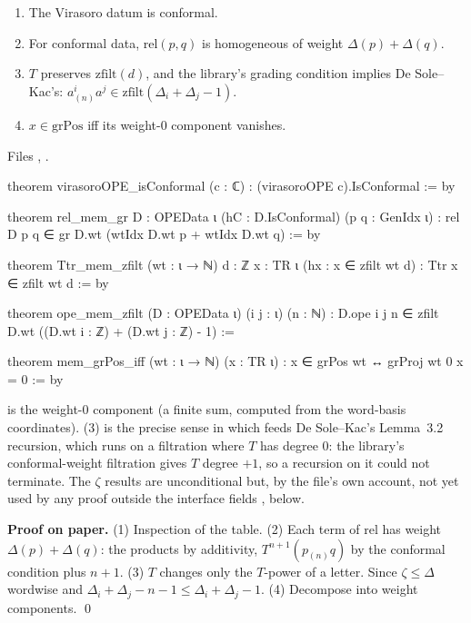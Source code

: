 \begin{theorem}\label{l11:thm:gradings}
\begin{enumerate}
\item The Virasoro datum is conformal.
\item For conformal data, $\mathrm{rel}(p,q)$ is homogeneous of weight $\Delta(p)+\Delta(q)$.
\item $T$ preserves $\mathrm{zfilt}(d)$, and the library's grading condition implies De Sole--Kac's: $a^i_{(n)}a^j\in\mathrm{zfilt}(\Delta_i+\Delta_j-1)$.
\item $x\in\mathrm{grPos}$ iff its weight-$0$ component vanishes.
\end{enumerate}
\end{theorem}
\noindent Files , .
\begin{leancode}
theorem virasoroOPE_isConformal (c : ℂ) : (virasoroOPE c).IsConformal := by

theorem rel_mem_gr {D : OPEData ι} (hC : D.IsConformal) (p q : GenIdx ι) :
    rel D p q ∈ gr D.wt (wtIdx D.wt p + wtIdx D.wt q) := by

theorem Ttr_mem_zfilt (wt : ι → ℕ) {d : ℤ} {x : TR ι} (hx : x ∈ zfilt wt d) :
    Ttr x ∈ zfilt wt d := by

theorem ope_mem_zfilt (D : OPEData ι) (i j : ι) (n : ℕ) :
    D.ope i j n ∈ zfilt D.wt ((D.wt i : ℤ) + (D.wt j : ℤ) - 1) :=

theorem mem_grPos_iff (wt : ι → ℕ) (x : TR ι) :
    x ∈ grPos wt ↔ grProj wt 0 x = 0 := by
\end{leancode}

\begin{dictionary}
 is the weight-$0$ component (a finite sum, computed from the word-basis coordinates). (3) is the precise sense in
which  feeds De Sole--Kac's Lemma~3.2 recursion, which runs on a filtration where $T$ has degree $0$: the library's
conformal-weight filtration gives $T$ degree $+1$, so a recursion on it could not terminate. The $\zeta$ results are unconditional but,
by the file's own account, not yet used by any proof outside the interface fields ,  below.
\end{dictionary}

\textbf{Proof on paper.} (1) Inspection of the table. (2) Each term of $\mathrm{rel}$ has weight $\Delta(p)+\Delta(q)$: the products by
additivity, $T^{n+1}(p_{(n)}q)$ by the conformal condition plus $n+1$. (3) $T$ changes only the $T$-power of a letter. Since
$\zeta\le\Delta$ wordwise and $\Delta_i+\Delta_j-n-1\le\Delta_i+\Delta_j-1$. (4) Decompose into weight components. \qed

